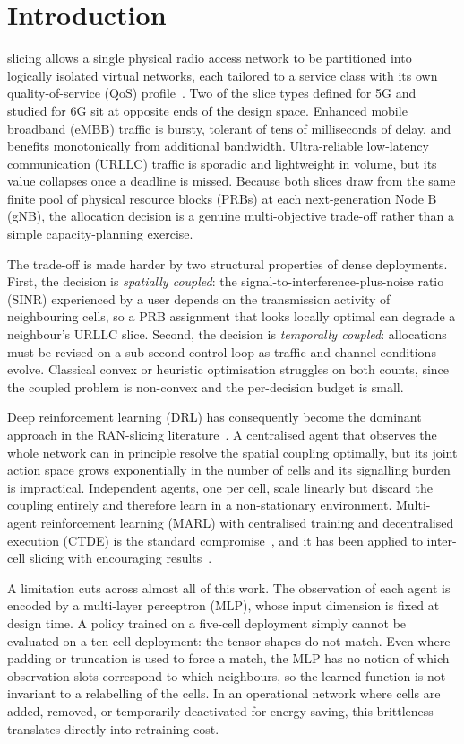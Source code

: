 \documentclass[journal]{IEEEtran}
\begin{document}
\section{Introduction}
 slicing allows a single physical radio access
network to be partitioned into logically isolated virtual networks,
each tailored to a service class with its own quality-of-service (QoS)
profile~\cite{wu2022ainative}. Two of the slice types defined for 5G
and studied for 6G sit at opposite ends of the design space. Enhanced
mobile broadband (eMBB) traffic is bursty, tolerant of tens of
milliseconds of delay, and benefits monotonically from additional
bandwidth. Ultra-reliable low-latency communication (URLLC) traffic is
sporadic and lightweight in volume, but its value collapses once a
deadline is missed. Because both slices draw from the same finite pool
of physical resource blocks (PRBs) at each next-generation Node B
(gNB), the allocation decision is a genuine multi-objective trade-off
rather than a simple capacity-planning exercise.

The trade-off is made harder by two structural properties of dense
deployments. First, the decision is \emph{spatially coupled}: the
signal-to-interference-plus-noise ratio (SINR) experienced by a user
depends on the transmission activity of neighbouring cells, so a PRB
assignment that looks locally optimal can degrade a neighbour's URLLC
slice. Second, the decision is \emph{temporally coupled}: allocations
must be revised on a sub-second control loop as traffic and channel
conditions evolve. Classical convex or heuristic optimisation
struggles on both counts, since the coupled problem is non-convex and
the per-decision budget is small.

Deep reinforcement learning (DRL) has consequently become the dominant
approach in the RAN-slicing literature~\cite{hurtado2022survey}. A
centralised agent that observes the whole network can in principle
resolve the spatial coupling optimally, but its joint action space
grows exponentially in the number of cells and its signalling burden is
impractical. Independent agents, one per cell, scale linearly but
discard the coupling entirely and therefore learn in a non-stationary
environment. Multi-agent reinforcement learning (MARL) with
centralised training and decentralised execution (CTDE) is the standard
compromise~\cite{papoudakis2021benchmarking}, and it has been applied
to inter-cell slicing with encouraging
results~\cite{hu2022intercell,naderializadeh2021marl}.

A limitation cuts across almost all of this work. The observation of
each agent is encoded by a multi-layer perceptron (MLP), whose input
dimension is fixed at design time. A policy trained on a five-cell
deployment simply cannot be evaluated on a ten-cell deployment: the
tensor shapes do not match. Even where padding or truncation is used to
force a match, the MLP has no notion of which observation slots
correspond to which neighbours, so the learned function is not
invariant to a relabelling of the cells. In an operational network
where cells are added, removed, or temporarily deactivated for energy
saving, this brittleness translates directly into retraining cost.
\end{document}
